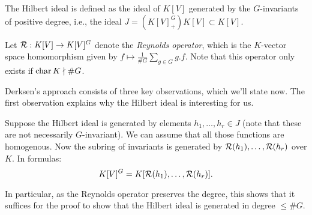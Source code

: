 \documentclass[../main.tex]{subfiles}
\begin{document}
\begin{defi}
    The Hilbert ideal is defined as the ideal of $K[V]$ generated by the 
    $G$-invariants of positive degree, i.e., the ideal $J = (K[V]^G_+) K[V] 
    \subset K[V]$. 
\end{defi}
Let $\mathcal{R}: K[V] \to K[V]^G$ denote the \emph{Reynolds operator}, which is the
$K$-vector space homomorphism given by $f \mapsto \allowbreak \frac{1}{\# G}
\allowbreak \sum_{g \in G} g.f$. Note that this operator only exists if $\operatorname{char} K
\nmid \# G$.

Derksen's approach consists of three key observations, which we'll state now.
The first observation explains why the Hilbert ideal is interesting for us.
\begin{prop}\label{prop:obs1}
    Suppose the Hilbert ideal is generated by elements $h_1, \dots, h_r \in J$ 
    (note that these are not necessarily $G$-invariant).
    We can assume that all those functions are homogenous. Now the subring of invariants
    is generated by $\mathcal{R}(h_1), \dots, \mathcal{R}(h_r)$ over $K$. In formulas:
    \begin{equation*}
        K[V]^G = K[\mathcal{R}(h_1), \dots, \mathcal{R}(h_r)].
    \end{equation*}
\end{prop}
In particular, as the Reynolds operator preserves the degree, this shows that
it suffices for the proof to show that the Hilbert ideal is generated in degree
$\leq \#G$.
\end{document}
